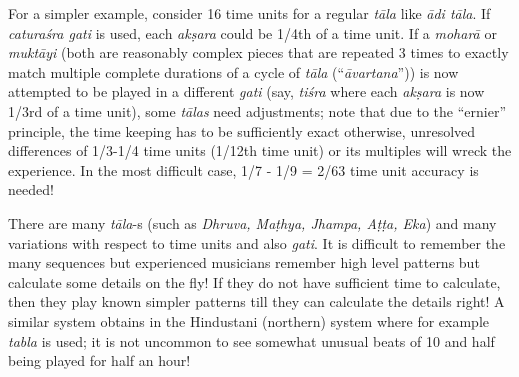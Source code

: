 For a simpler example, consider 16 time units for a regular \textsl{tāla} like \textsl{ādi tāla}. If \textsl{caturaśra gati} is used, each \textsl{akṣara} could be 1/4th of a time unit. If a \textsl{moharā} or \textsl{muktāyi} (both are reasonably complex pieces that are repeated 3 times to exactly match multiple complete durations of a cycle of \textsl{tāla} (“\textsl{āvartana}”)) is now attempted to be played in a different \textsl{gati} (say, \textsl{tiśra} where each \textsl{akṣara} is now 1/3rd of a time unit), some \textsl{tālas} need adjustments; note that due to the “ernier” principle, the time keeping has to be sufficiently exact otherwise, unresolved differences of 1/3-1/4 time units (1/12th time unit) or its multiples will wreck the experience. In the most difficult case, 1/7 - 1/9 = 2/63 time unit accuracy is needed!

There are many \textsl{tāla}-s (such as \textsl{Dhruva, Maṭhya, Jhampa, Aṭṭa, Eka}) and many variations with respect to time units and also \textsl{gati}. It is difficult to remember the many sequences but experienced musicians remember high level patterns but calculate some details on the fly! If they do not have sufficient time to calculate, then they play known simpler patterns till they can calculate the details right! A similar system obtains in the Hindustani (northern) system where for example \textsl{tabla} is used; it is not uncommon to see somewhat unusual beats of 10 and half being played for half an hour! 

